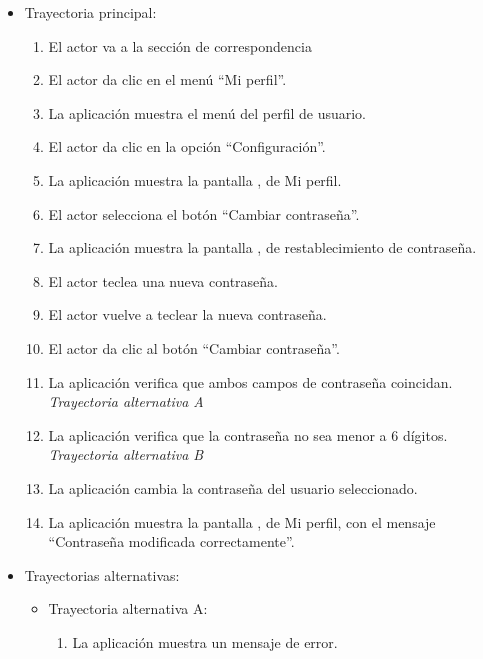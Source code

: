 			\begin{itemize}
				\item Trayectoria principal:
					\begin{enumerate}
						\item El actor va a la sección de correspondencia 
						\item El actor da clic en el menú ``Mi perfil''.
						\item La aplicación muestra el menú del perfil de usuario.
						\item El actor da clic en la opción ``Configuración''.
						\item La aplicación muestra la pantalla , de Mi perfil.
						\item El actor selecciona el botón ``Cambiar contraseña''.
						\item La aplicación muestra la pantalla , de restablecimiento de contraseña.
						\item El actor teclea una nueva contraseña.
						\item El actor vuelve a teclear la nueva contraseña.
						\item El actor da clic al botón ``Cambiar contraseña''.
						\item La aplicación verifica que ambos campos de contraseña coincidan. \textsl{Trayectoria alternativa A}
						\item La aplicación verifica que la contraseña no sea menor a 6 dígitos. \textsl{Trayectoria alternativa B}
						\item La aplicación cambia la contraseña del usuario seleccionado.
						\item La aplicación muestra la pantalla , de Mi perfil, con el mensaje ``Contraseña modificada correctamente''.
					\end{enumerate}
				\item Trayectorias alternativas:
					\begin{itemize}
						\item Trayectoria alternativa A:
							\begin{enumerate}
								\item La aplicación muestra un mensaje de error.
							\end{enumerate}
					\end{itemize}
			\end{itemize}

\newpage

